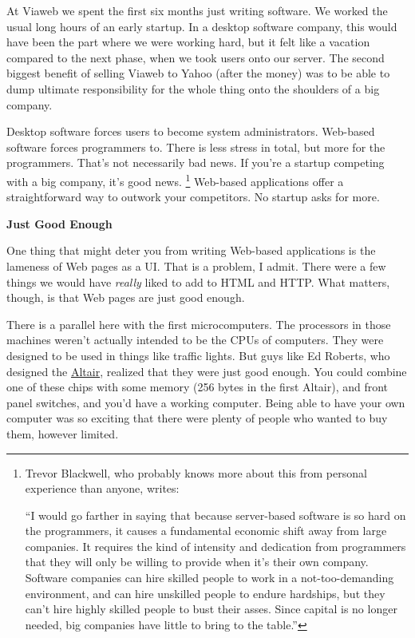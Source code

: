 \documentclass[12pt]{book}
\begin{document}
At Viaweb we spent the first six months just writing software. We worked
the usual long hours of an early startup. In a desktop software company,
this would have been the part where we were working hard, but it felt
like a vacation compared to the next phase, when we took users onto our
server. The second biggest benefit of selling Viaweb to Yahoo (after the
money) was to be able to dump ultimate responsibility for the whole
thing onto the shoulders of a big company.

Desktop software forces users to become system administrators. Web-based
software forces programmers to. There is less stress in total, but more
for the programmers. That's not necessarily bad news. If you're a
startup competing with a big company, it's good news. \footnote{Trevor Blackwell, who probably knows more about this from
personal experience than anyone, writes:

``I would go farther in saying that because server-based software is so
hard on the programmers, it causes a fundamental economic shift away
from large companies. It requires the kind of intensity and dedication
from programmers that they will only be willing to provide when it's
their own company. Software companies can hire skilled people to work in
a not-too-demanding environment, and can hire unskilled people to endure
hardships, but they can't hire highly skilled people to bust their
asses. Since capital is no longer needed, big companies have little to
bring to the table.''} Web-based
applications offer a straightforward way to outwork your competitors. No
startup asks for more.

\textbf{Just Good Enough}

One thing that might deter you from writing Web-based applications is
the lameness of Web pages as a UI. That is a problem, I admit. There
were a few things we would have \emph{really} liked to add to HTML and
HTTP. What matters, though, is that Web pages are just good enough.

There is a parallel here with the first microcomputers. The processors
in those machines weren't actually intended to be the CPUs of computers.
They were designed to be used in things like traffic lights. But guys
like Ed Roberts, who designed the
\href{http://en.wikipedia.org/wiki/Altair_8800}{Altair}, realized that
they were just good enough. You could combine one of these chips with
some memory (256 bytes in the first Altair), and front panel switches,
and you'd have a working computer. Being able to have your own computer
was so exciting that there were plenty of people who wanted to buy them,
however limited.
\end{document}
